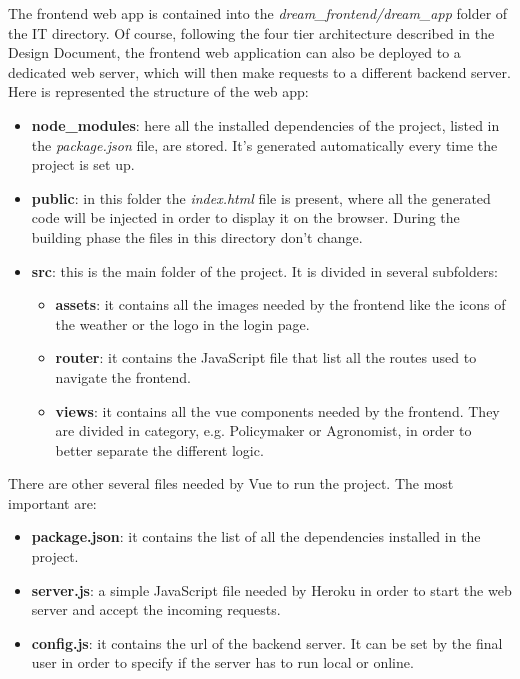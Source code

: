 \documentclass[table, 12pt]{article}
\begin{document}
The frontend web app is contained into the \textit{dream\_frontend/dream\_app} folder of
the IT directory.
Of course, following the four tier architecture described in the Design Document,
the frontend web application can also be deployed to a dedicated web server,
which will then make requests to a different backend server.
Here is represented the structure of the web app:
\begin{itemize}
    \item \textbf{node\_modules}: here all the installed dependencies of the project, listed in the \textit{package.json} file, are stored.
    It's generated automatically every time the project is set up.
    \item \textbf{public}: in this folder the \textit{index.html} file is present, where all the generated code will be injected in order to display it on the browser.
    During the building phase the files in this directory don't change.
    \item \textbf{src}: this is the main folder of the project. It is divided in several subfolders:
    \begin {itemize} 
        \item \textbf{assets}: it contains all the images needed by the frontend like the icons of the weather or the logo in the login page.
        \item \textbf{router}: it contains the JavaScript file that list all the routes used to navigate the frontend.
        \item \textbf{views}: it contains all the vue components needed by the frontend.
        They are divided in category, e.g. Policymaker or Agronomist, in order to better separate the different logic.
    \end{itemize}
\end{itemize}

There are other several files needed by Vue to run the project. The most important are:
\begin{itemize}
    \item \textbf{package.json}: it contains the list of all the dependencies installed in the project.
    \item \textbf{server.js}: a simple JavaScript file needed by Heroku in order to start the web server and accept the incoming requests.
    \item \textbf{config.js}: it contains the url of the backend server.
    It can be set by the final user in order to specify if the server has to run local or online.
\end{itemize}
\end{document}
